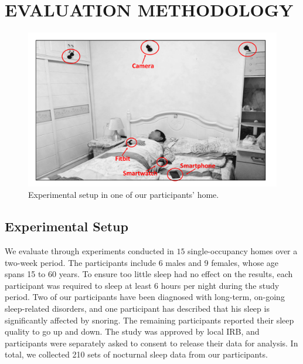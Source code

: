 \section{EVALUATION METHODOLOGY}\label{sec:expsetup}


\begin{figure}[!t]
	\centering
	\includegraphics[width=0.57\linewidth]{Figures/setup.pdf}
	\caption{Experimental setup in one of our participants' home. }\label{fig:setup}
\end{figure}



\subsection{Experimental Setup\label{sec:evalusers}}

We evaluate {\systemname} through experiments conducted in $15$ single-occupancy homes over a two-week period.  The participants include 6 males and 9 females, whose age spans 15 to 60 years. To ensure too little sleep had no effect on the results, each participant was required to sleep at least $6$ hours per night during the study period. Two of our participants have been diagnosed with long-term, on-going sleep-related disorders, and one participant has described that his sleep is significantly affected by snoring. The remaining participants reported their sleep quality to go up and down. The study was approved by local IRB, and participants were separately asked to consent to release their data for analysis. In total, we collected 210 sets of nocturnal sleep data from our participants.


